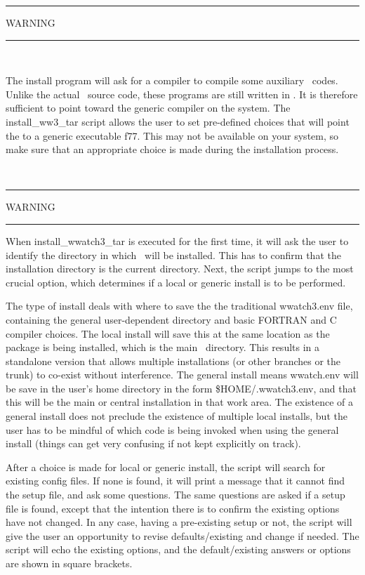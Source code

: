 \begin{center}
\rule[1mm]{55mm}{1.0mm} WARNING \rule[1mm]{55mm}{1.0mm} \\ 
\vspace{\baselineskip}

\parbox{120mm}{The install program will ask for a compiler to compile some
auxiliary \fortran\ codes. Unlike the actual \ws\ source code, these programs
are still written in . It is therefore sufficient to point toward
the generic  compiler on the system. The {\file install\_ww3\_tar}
script allows the user to set pre-defined choices that will point the
 to a generic executable {\file f77}. This may not be available on
your system, so make sure that an appropriate choice is made during the
installation process.}
\\ \vspace{\baselineskip} \rule[1mm]{55mm}{1.0mm}
WARNING \rule[1mm]{55mm}{1.0mm}
\end{center}

When {\file install\_wwatch3\_tar} is executed for the first time, it will ask
the user to identify the directory in which \ws\ will be installed. This has
to confirm that the installation directory is the current directory. Next, the
script jumps to the most crucial option, which determines if a local or generic install 
is to be performed.

The type of install deals with where to save the the traditional {\file wwatch3.env} 
file, containing the general user-dependent directory and basic FORTRAN and C compiler 
choices. The local install will save this at the same location as the package
is being installed, which is the main \ws\ directory. This results in a standalone version
that allows multiple installations (or other branches or the trunk) to co-exist
without interference. The general install means wwatch.env will be save in the user's
home directory in the form {\file \$HOME/.wwatch3.env}, and that this will be the
main or central installation in that work area. The existence of a general install
does not preclude the existence of multiple local installs, but the user has to be 
mindful of which code is being invoked when using the general install (things can
get very confusing if not kept explicitly on track).

After a choice is made for local or generic install, the script will search for
existing config files. If none is found, it will print a message that it cannot find 
the setup file, and ask some questions. The same questions are asked if a setup file is found,
except that the intention there is to confirm the existing options have not changed. In any case,
having a pre-existing setup or not, the script will give the user an opportunity to revise
defaults/existing and change if needed. The script will echo the existing options, and the 
default/existing answers or options are shown in square brackets. 

